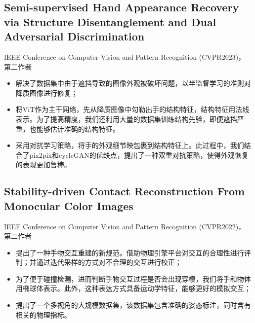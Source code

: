\documentclass{resume}
\begin{document}
\subsection{\textbf{Semi-supervised Hand Appearance Recovery via Structure Disentanglement and Dual Adversarial Discrimination}}
IEEE Conference on Computer Vision and Pattern Recognition (CVPR2023)， 第二作者
\begin{itemize}
  \item 解决了数据集中由于遮挡导致的图像外观被破坏问题，以半监督学习的准则对降质图像进行修复；
  \item 将ViT作为主干网络，先从降质图像中勾勒出手的结构特征，结构特征用法线表示。为了提高精度，我们还利用大量的数据集训练结构先验，即便遮挡严重，也能够估计准确的结构特征。
  \item 采用对抗学习策略，将手的外观细节映包裹到结构特征上。此过程中，我们结合了pix2pix和cycleGAN的优缺点，提出了一种双重对抗策略，使得外观恢复的表现更加鲁棒。
\end{itemize}

\subsection{\textbf{Stability-driven Contact Reconstruction From Monocular Color Images}}
IEEE Conference on Computer Vision and Pattern Recognition (CVPR2022)，  第二作者
\begin{itemize}
  \item 提出了一种手物交互重建的新规范。借助物理引擎平台对交互的合理性进行评判；并通过迭代采样的方式对不合理的交互进行校正；
  \item 为了便于碰撞检测，进而判断手物交互过程是否会出现穿模，我们将手和物体用椭球体表示。此外，这种表达方式具备运动学特征，能够更好的模拟交互；
  \item 提出了一个多视角的大规模数据集，该数据集包含准确的姿态标注，同时含有相关的物理指标。
\end{itemize}


\end{document}
